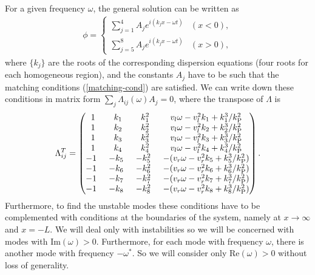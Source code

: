 \documentclass[12pt]{article}
\begin{document}
For a given frequency $\omega$, the general solution can be written as
\begin{align}
\phi = \begin{cases}
\displaystyle\sum _{j=1}^4 A_j e^{i(k_jx - \omega t)}& (x<0),\\
\displaystyle\sum _{j=5}^8 A_j e^{i(k_jx - \omega t)}& (x>0),
\end{cases}
\end{align}
where $\{ k_j\}$ are the roots of the corresponding dispersion
equations (four roots for each homogeneous region), and the constants $A_j$
have to be such that the matching conditions
(\ref{matching-cond}) are satisfied. We can write down
these conditions in matrix form $\sum_j\Lambda_{ij}(\omega)A_j=0$, where
the transpose of $\Lambda$ is
\begin{align}
\Lambda_{ij}^T=
\begin{pmatrix}
1 & k_1 & k_1^2 &  v_l\omega-v_l^2 k_1+ k_1^3/k_\text{P}^2
\\
1 & k_2 & k_2^2 & v_l\omega-v_l^2 k_2+ k_2^3/k_\text{P}^2
\\
1 & k_3 & k_3^2 & v_l\omega-v_l^2 k_3+ k_3^3/k_\text{P}^2
\\
1 & k_4 & k_4^2 & v_l\omega-v_l^2 k_4+ k_4^3/k_\text{P}^2
\\
-1\hspace*{1ex}  & -k_5\hspace*{1ex} & -k_5^2\hspace*{1ex} &-(v_r\omega-v_r^2 k_5+ k_5^3/k_\text{P}^2)
\\
-1\hspace*{1ex} & -k_6\hspace*{1ex} & -k_6^2\hspace*{1ex} &-(v_r\omega-v_r^2 k_6+ k_6^3/k_\text{P}^2)
\\
-1\hspace*{1ex} & -k_7\hspace*{1ex} & -k_7^2\hspace*{1ex} & -(v_r\omega-v_r^2 k_7+ k_7^3/k_\text{P}^2)
\\
-1\hspace*{1ex} &-k_8\hspace*{1ex} & -k_8^2\hspace*{1ex} & -(v_r\omega-v_r^2 k_8+ k_8^3/k_\text{P}^2)
\\
\end{pmatrix}.
\label{lambda-matrix}
\end{align}
Furthermore, to find the unstable modes these conditions have to be complemented with
conditions at the boundaries of the system, namely at $x\to\infty$ and $x=-L$. 
We will deal only with instabilities so we will be concerned with modes with $\text{Im}(\omega)>0$. Furthermore, for each mode with frequency $\omega$, there is another mode with frequency $-\omega^*$. So we will consider only $\text{Re}(\omega)>0$ without loss of generality.  
\end{document}
